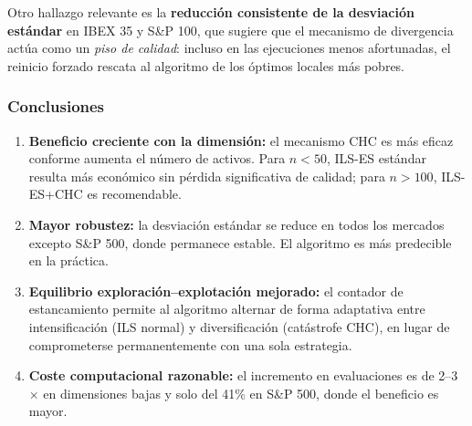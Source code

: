 Otro hallazgo relevante es la \textbf{reducción consistente de la desviación estándar} en IBEX 35
y S\&P 100, que sugiere que el mecanismo de divergencia actúa como un \emph{piso de calidad}:
incluso en las ejecuciones menos afortunadas, el reinicio forzado rescata al algoritmo de los
óptimos locales más pobres.

\subsubsection*{Conclusiones}

\begin{enumerate}[noitemsep]
  \item \textbf{Beneficio creciente con la dimensión:} el mecanismo CHC es más eficaz conforme
  aumenta el número de activos. Para $n < 50$, ILS-ES estándar resulta más económico sin pérdida
  significativa de calidad; para $n > 100$, ILS-ES+CHC es recomendable.
  \item \textbf{Mayor robustez:} la desviación estándar se reduce en todos los mercados excepto
  S\&P 500, donde permanece estable. El algoritmo es más predecible en la práctica.
  \item \textbf{Equilibrio exploración--explotación mejorado:} el contador de estancamiento permite
  al algoritmo alternar de forma adaptativa entre intensificación (ILS normal) y diversificación
  (catástrofe CHC), en lugar de comprometerse permanentemente con una sola estrategia.
  \item \textbf{Coste computacional razonable:} el incremento en evaluaciones es de 2--3$\times$ en
  dimensiones bajas y solo del 41\% en S\&P 500, donde el beneficio es mayor.
\end{enumerate}

